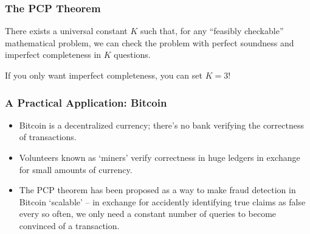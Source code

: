 \documentclass{beamer}
\begin{document}
\begin{frame}
    \frametitle{The PCP Theorem}

    \begin{theorem}
        There exists a universal constant $K$ such that, for any ``feasibly checkable'' mathematical problem, we can check the problem with perfect soundness and imperfect completeness in $K$ questions.
    \end{theorem}

    \begin{theorem}[1997, H\r{a}stad]
        If you only want imperfect completeness, you can set $K = 3$!
    \end{theorem}
\end{frame}

\begin{frame}
    \frametitle{A Practical Application: Bitcoin}

    \begin{itemize}
        \item Bitcoin is a decentralized currency; there's no bank verifying the correctness of transactions.

        \item Volunteers known as `miners' verify correctness in huge ledgers in exchange for small amounts of currency.

        \item The PCP theorem has been proposed as a way to make fraud detection in Bitcoin `scalable' -- in exchange for accidently identifying true claims as false every so often, we only need a constant number of queries to become convinced of a transaction.
    \end{itemize}
\end{frame}
\end{document}

